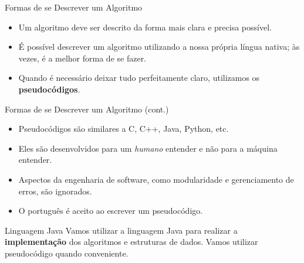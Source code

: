 \documentclass[aspectratio=169]{beamer}
\begin{document}
\begin{frame}{Formas de se Descrever um Algoritmo}
  \begin{itemize}
    \item Um algoritmo deve ser descrito da forma mais clara e precisa possível.
    \item É possível descrever um algoritmo utilizando a nossa própria língua nativa; às vezes, é a melhor forma de se fazer.
    \item Quando é necessário deixar tudo perfeitamente claro, utilizamos os \textbf{pseudocódigos}.
  \end{itemize}
\end{frame}

\begin{frame}[shrink]{Formas de se Descrever um Algoritmo (cont.)}
  \begin{itemize}
    \item Pseudocódigos são similares a C, C++, Java, Python, etc.
    \item Eles são desenvolvidos para um \emph{humano} entender e não para a máquina entender.
    \item Aspectos da engenharia de software, como modularidade e gerenciamento de erros, são ignorados.
    \item O português é aceito ao escrever um pseudocódigo.
  \end{itemize}

  \begin{alertblock}{Linguagem Java}
	  Vamos utilizar a \alert{linguagem Java} para realizar a \textbf{implementação} dos algoritmos e estruturas de dados. Vamos utilizar pseudocódigo quando conveniente. 
  \end{alertblock}
\end{frame}
\end{document}
